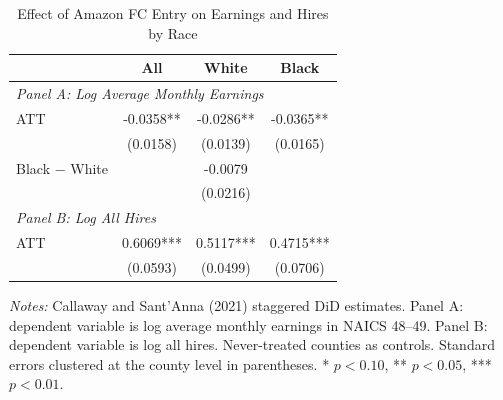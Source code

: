 \begin{table}[t]
\centering
\caption{Effect of Amazon FC Entry on Earnings and Hires by Race}
\label{tab:earnings_hires}
\begin{threeparttable}
\begin{tabular}{lccc}
\toprule
& All & White & Black \\
\midrule
\multicolumn{4}{l}{\textit{Panel A: Log Average Monthly Earnings}} \\[3pt]
\quad ATT & -0.0358** & -0.0286** & -0.0365** \\
& (0.0158) & (0.0139) & (0.0165) \\[3pt]
\quad Black $-$ White & \multicolumn{3}{c}{-0.0079} \\
& \multicolumn{3}{c}{(0.0216)} \\[6pt]
\multicolumn{4}{l}{\textit{Panel B: Log All Hires}} \\[3pt]
\quad ATT & 0.6069*** & 0.5117*** & 0.4715*** \\
& (0.0593) & (0.0499) & (0.0706) \\
\bottomrule
\end{tabular}
\begin{tablenotes}[flushleft]
\small
\item \textit{Notes:} Callaway and Sant'Anna (2021) staggered DiD estimates. Panel A: dependent variable is log average monthly earnings in NAICS 48--49. Panel B: dependent variable is log all hires. Never-treated counties as controls. Standard errors clustered at the county level in parentheses. * $p < 0.10$, ** $p < 0.05$, *** $p < 0.01$.
\end{tablenotes}
\end{threeparttable}
\end{table}
